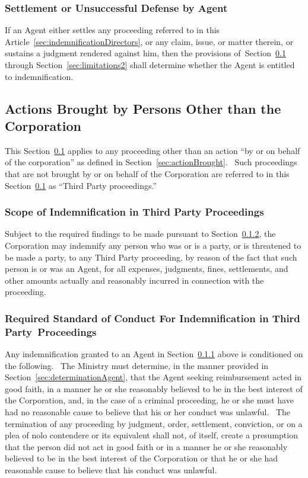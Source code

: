 \documentclass[letterpaper,titlepage]{article}
\begin{document}
\subsubsection{Settlement or Unsuccessful Defense by Agent}
\label{sec:settlement}
If an Agent either settles any proceeding referred to in this
Article~\ref{sec:indemnificationDirectors}, or any claim, issue, or matter
therein, or sustains a judgment rendered against him, then the provisions
of Section~\ref{sec:actionsBrought} through Section~\ref{sec:limitations2}
shall determine whether the Agent is entitled to indemnification.
\subsection{Actions Brought by Persons Other than the Corporation}
\label{sec:actionsBrought}
This Section~\ref{sec:actionsBrought} applies to any proceeding other than an
action ``by or on behalf of the corporation'' as defined in
Section~\ref{sec:actionBrought}.  Such proceedings that are not brought by or
on behalf of the Corporation are referred to in this
Section~\ref{sec:actionsBrought} as ``Third Party proceedings.''
\subsubsection{Scope of Indemnification in Third Party Proceedings}
\label{sec:scopeIndemnificationThird}
Subject to the required findings to be made pursuant to
Section~\ref{sec:requiredStandard}, the Corporation may indemnify any person
who was or is a party, or is threatened to be made a party, to any Third Party
proceeding, by reason of the fact that such person is or was an Agent, for all
expenses, judgments, fines, settlements, and other amounts actually and
reasonably incurred in connection with the proceeding. 
\subsubsection{Required Standard of Conduct For Indemnification in Third
Party Proceedings}
\label{sec:requiredStandard}
Any indemnification granted to an Agent in
Section~\ref{sec:scopeIndemnificationThird} above is conditioned on the
following.  The Ministry must determine, in the manner provided in
Section~\ref{sec:determinationAgent}, that the Agent seeking reimbursement
acted in good faith, in a manner he or she reasonably believed to be in the
best interest of the Corporation, and, in the case of a criminal proceeding, he
or she must have had no reasonable cause to believe that his or her conduct was
unlawful.  The termination of any proceeding by judgment, order, settlement,
conviction, or on a plea of nolo contendere or its equivalent shall not, of
itself, create a presumption that the person did not act in good faith or in a
manner he or she reasonably believed to be in the best interest of the
Corporation or that he or she had reasonable cause to believe that his conduct
was unlawful.
\end{document}
